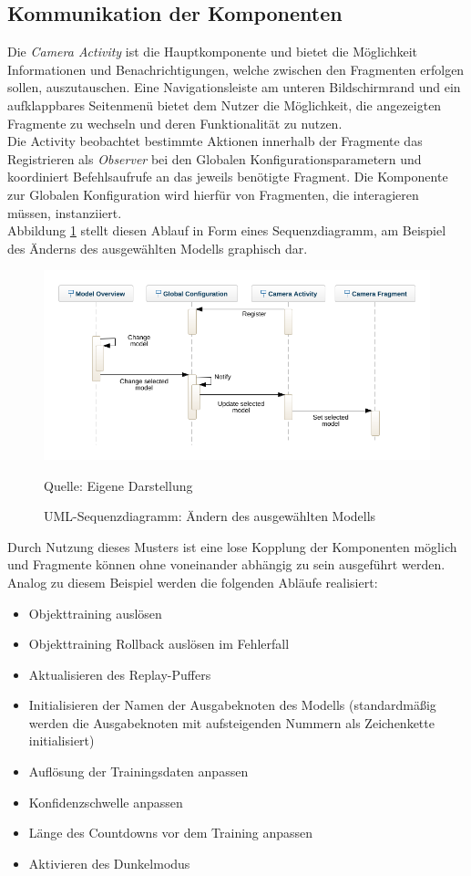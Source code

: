 \documentclass[oneside]{ausarbeitung}
\begin{document}
\subsection{Kommunikation der Komponenten}
\label{cha:communication-components}
Die \textit{Camera Activity} ist die Hauptkomponente und bietet die Möglichkeit Informationen und Benachrichtigungen, welche zwischen den Fragmenten erfolgen sollen, auszutauschen. Eine Navigationsleiste am unteren Bildschirmrand und ein aufklappbares Seitenmenü bietet dem Nutzer die Möglichkeit, die angezeigten Fragmente zu wechseln und deren Funktionalität zu nutzen.\\
Die Activity beobachtet bestimmte Aktionen innerhalb der Fragmente das Registrieren als \textit{Observer} bei den Globalen Konfigurationsparametern und koordiniert Befehlsaufrufe an das jeweils benötigte Fragment. Die Komponente zur Globalen Konfiguration wird hierfür von Fragmenten, die interagieren müssen, instanziiert.\\
Abbildung \ref{fig:sequence-diagram-change-model} stellt diesen  Ablauf in Form eines Sequenzdiagramm, am Beispiel des Änderns des ausgewählten Modells graphisch dar. 

\begin{figure}[hptb]
	\centering
	\includegraphics[height=0.35\textheight]{images/sequence-diagram-change-model.png}
	\caption{UML-Sequenzdiagramm: Ändern des ausgewählten Modells} Quelle: Eigene Darstellung
	\label{fig:sequence-diagram-change-model}
\end{figure}

Durch Nutzung dieses Musters ist eine lose Kopplung der Komponenten möglich und Fragmente können ohne voneinander abhängig zu sein ausgeführt werden. Analog zu diesem Beispiel werden die folgenden Abläufe realisiert:
\begin{itemize}
	\item Objekttraining auslösen
	\item Objekttraining Rollback auslösen im Fehlerfall
	\item Aktualisieren des Replay-Puffers
	\item Initialisieren der Namen der Ausgabeknoten des Modells (standardmäßig werden die Ausgabeknoten mit aufsteigenden Nummern als Zeichenkette initialisiert)
	\item Auflösung der Trainingsdaten anpassen
	\item Konfidenzschwelle anpassen
	\item Länge des Countdowns vor dem Training anpassen
	\item Aktivieren des Dunkelmodus
\end{itemize}
\end{document}
